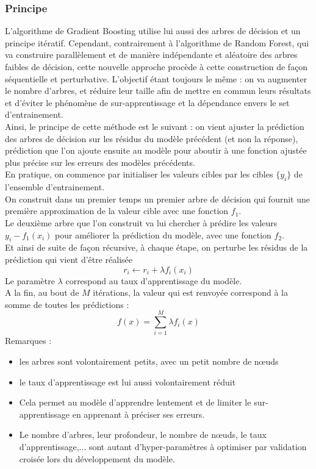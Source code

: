 \documentclass{article}
\theoremstyle{nopointbreak}
\theoremstyle{nobrkbold}
\begin{document}
\subsubsection{Principe}
L'algorithme de Gradient Boosting utilise lui aussi des arbres de décision et un principe itératif. Cependant, contrairement à l'algorithme de Random Forest, qui va construire parallèlement et de manière indépendante et aléatoire des arbres faibles de décision, cette nouvelle approche procède à cette construction de façon séquentielle et perturbative. L'objectif étant toujours le même : on va augmenter le nombre d'arbres, et réduire leur taille afin de mettre en commun leurs résultats et d'éviter le phénomène de sur-apprentissage et la dépendance envers le set d'entrainement. \\
Ainsi, le principe de cette méthode est le suivant : on vient ajuster la prédiction des arbres de décision sur les résidus du modèle précédent (et non la réponse), prédiction que l'on ajoute ensuite au modèle pour aboutir à une fonction ajustée plus précise sur les erreurs des modèles précédents. \\
En pratique, on commence par initialiser les valeurs cibles par les cibles $\{ y_{i} \}$ de l'ensemble d'entrainement. \\ 
On construit dans un premier temps un premier arbre de décision qui fournit une première approximation de la valeur cible avec une fonction $f_{1}$. \\
Le deuxième arbre que l'on construit va lui chercher à prédire les valeurs $y_{i} - f_{1}(x_{i})$ pour améliorer la prédiction du modèle, avec une fonction $f_{2}$. \\
Et ainsi de suite de façon récursive, à chaque étape, on perturbe les résidus de la prédiction qui vient d'être réalisée $$r_{i} \longleftarrow r_{i} + \lambda f_{i}(x_{i})$$ 
Le paramètre $\lambda$ correspond au taux d'apprentissage du modèle. \\

A la fin, au bout de $M$ itérations, la valeur qui est renvoyée correspond à la somme de toutes les prédictions :  $$f(x) = \sum_{i = 1}^{M}\lambda f_{i}(x)$$
Remarques :
\begin{itemize} 
    \item les arbres sont volontairement petits, avec un petit nombre de nœuds
    \item le taux d'apprentissage est lui aussi volontairement réduit
    \item Cela permet au modèle d'apprendre lentement et de limiter le sur-apprentissage en apprenant à préciser ses erreurs. 
    \item Le nombre d'arbres, leur profondeur, le nombre de nœuds, le taux d'apprentissage,... sont autant d'hyper-paramètres à optimiser par validation croisée lors du développement du modèle. 
\end{itemize}
\end{document}
